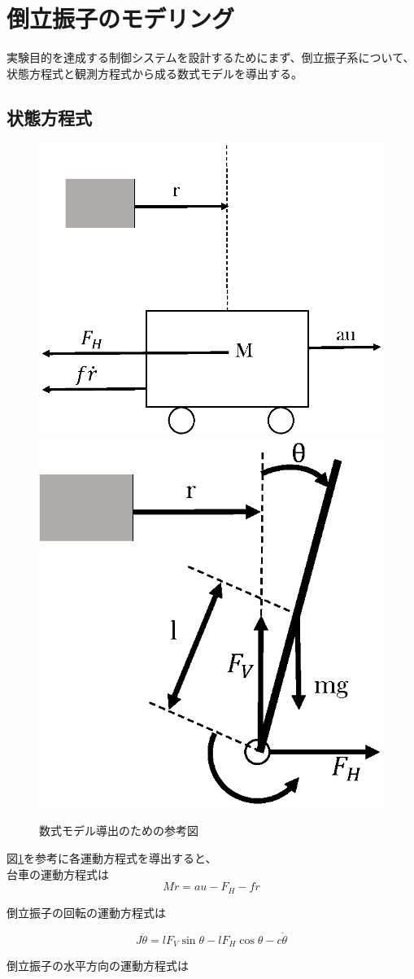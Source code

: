 \section{倒立振子のモデリング}
実験目的を達成する制御システムを設計するためにまず、倒立振子系について、状態方程式と観測方程式から成る数式モデルを導出する。
\subsection{状態方程式}
	\begin{figure}[H]
		\centering
		\includegraphics[width=0.4\linewidth]{gazo/cart.eps}
		\includegraphics[width=0.4\linewidth]{gazo/stick.eps}
		\caption{数式モデル導出のための参考図}
		\label{image:reference}
	\end{figure}	
	図\ref{image:reference}を参考に各運動方程式を導出すると、\\
	台車の運動方程式は\\
	
	\begin{equation}
		M\ddot{r}=au-F_{H}-f\dot{r}
		\label{eq:motion_eq_cart}
	\end{equation}
	
	\noindent
	倒立振子の回転の運動方程式は
	
	\begin{equation}
		J\ddot{\theta}=lF_{V}\sin \theta -lF_{H}\cos \theta -c\dot{\theta}
		\label{eq:rotemotion_eq_stick}
	\end{equation}
	
	\newpage
	\noindent
	倒立振子の水平方向の運動方程式は
	

